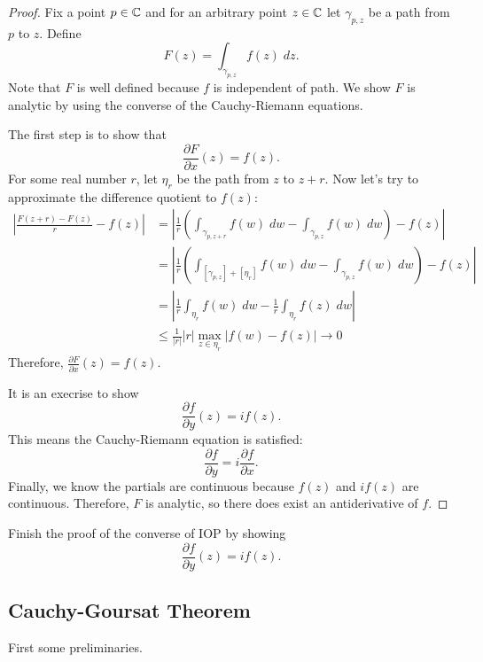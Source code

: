 \documentclass[notes]{subfile}
\begin{document}
\begin{proof}
    Fix a point $p \in \operatorname{\mathbb{C}}$ and for an arbitrary point $z \in \operatorname{\mathbb{C}}$
    let $\gamma_{p, z}$ be a path from $p$ to $z$.
    Define
    \[ F(z) = \int_{\gamma_{p, z}} f(z) \; dz. \]
    Note that $F$ is well defined because $f$ is independent
    of path.
    We show $F$ is analytic by using
    the converse of the Cauchy-Riemann equations.

    \noindent
    The first step is to show that
    \[ \frac{\partial F}{\partial x}(z) = f(z). \]
    For some real number $r$,
    let $\eta_r$ be the path from $z$ to $z + r$.
    Now let's try to approximate the difference quotient
    to $f(z)$:
    \begin{align*}
        \left| \frac{F(z+r) - F(z)}{r} - f(z)\right| &= 
        \left| \frac{1}{r}\left( \int_{\gamma_{p, z+r}} f(w) \; dw - 
        \int_{\gamma_{p, z}} f(w) \; dw \right)  - f(z) \right| \\
        &= \left| \frac{1}{r}\left( \int_{[\gamma_{p, z}] + [\eta_r]} f(w) \; dw - 
        \int_{\gamma_{p, z}} f(w) \; dw \right)  - f(z) \right| \tag{Independence of Path} \\
        &= \left| \frac{1}{r} \int_{\eta_r} f(w) \; dw - 
        \frac{1}{r} \int_{\eta_r} f(z) \; dw  \right| \tag{Concatenation of Paths} \\
        &\le \frac{1}{|r|} |r| \max_{z \in \eta_r} |f(w) - f(z)|
        \to 0 \tag{ML and Continuity of $f$}
    \end{align*}
    Therefore, $\frac{\partial F}{\partial x}(z) = f(z)$.

    \noindent
    It is an execrise to show
    \[ \frac{\partial f}{\partial y} (z) = if(z). \]
    This means the Cauchy-Riemann equation is satisfied:
    \[ \frac{\partial f}{\partial y} = i \frac{\partial f}{\partial x}. \]
    Finally, we know the partials are continuous because
    $f(z)$ and $if(z)$ are continuous.
    Therefore, $F$ is analytic, so there does exist an 
    antiderivative of $f$.

\end{proof}

\begin{exercise}
    Finish the proof of the converse of IOP by showing
    \[ \frac{\partial f}{\partial y} (z) = if(z). \]
\end{exercise}


\subsection{Cauchy-Goursat Theorem}
First some preliminaries.
\end{document}
